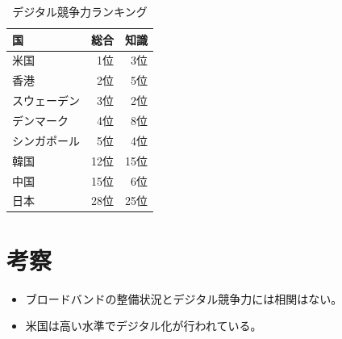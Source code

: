\documentclass[a4paper,11pt,dvipdfmx]{ujarticle}
\begin{document}
\begin{table}[htbp]
    \centering
    \caption{デジタル競争力ランキング}
    \label{tbl:利用状況}

    \begin{tabular}{|l|r|r|}
        \hline
        国 & 総合 & 知識 \\
        \hline
        米国 & 1位 & 3位 \\
        \hline
        香港 & 2位 & 5位 \\
        \hline
        スウェーデン & 3位 & 2位 \\
        \hline
        デンマーク & 4位 & 8位 \\
        \hline
        シンガポール & 5位 & 4位 \\
        \hline
        \hline
        韓国 & 12位 & 15位 \\
        \hline 
        中国 & 15位 & 6位 \\
        \hline
        \hline
        日本 & 28位 & 25位 \\
        \hline
    \end{tabular}
\end{table}

\section{考察}
\begin{itemize}
    \item ブロードバンドの整備状況とデジタル競争力には相関はない。
    \item 米国は高い水準でデジタル化が行われている。
\end{itemize}






%

%



\end{document}
